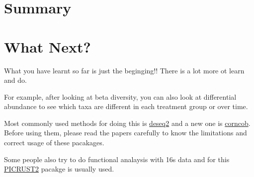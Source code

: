 \documentclass[
]{book}
\begin{document}
\hypertarget{summary}{%
\chapter{Summary}\label{summary}}

\hypertarget{what-next}{%
\chapter{What Next?}\label{what-next}}

What you have learnt so far is just the beginging!! There is a lot more ot learn and do.

For example, after looking at beta diversity, you can also look at differential abundance to see which taxa are different in each treatment group or over time.

Most commonly used methods for doing this is \href{https://bioconductor.org/packages/release/bioc/html/DESeq2.html}{deseq2} and a new one is \href{https://github.com/bryandmartin/corncob/}{corncob}. Before using them, please read the papers carefully to know the limitations and correct usage of these pacakages.

Some people also try to do functional analaysis with 16s data and for this \href{https://github.com/picrust/picrust2/wiki}{PICRUST2} pacakge is usually used.

  
\end{document}
